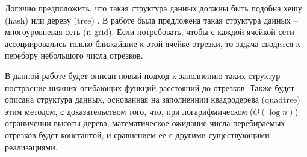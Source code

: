 Логично предположить, что такая структура данных должны быть
подобна хешу (hash) \cite{AHU} или дереву (tree) \cite{QT, SQT, FANN}. В работе \cite{NGRID} была предложена
такая структура данных -- многоуровневая сеть (n-grid). Если потребовать,
чтобы с каждой ячейкой сети ассоциировались только ближайшие к этой
ячейке отрезки, то задача сводится к перебору небольшого числа отрезков.

В данной работе будет описан новый подход к заполнению таких структур --
построение нижних огибающих функций расстояний до отрезков. Также будет описана
структура данных, основанная на заполненнии квадродерева (quadtree) этим методом,
с доказательством того, что, при логарифмическом ($O(\log n)$) ограничении высоты дерева,
математическое ожидание числа перебираемых отрезков будет константой, и сравнением ее
с другими существующими реализациями.  

\FloatBarrier
